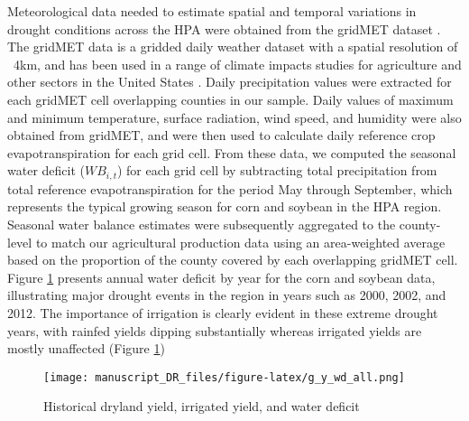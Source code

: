 \documentclass[
]{article}
\begin{document}
Meteorological data needed to estimate spatial and temporal variations in drought conditions across the HPA were obtained from the gridMET dataset \citep{Abatzoglou2013}. The gridMET data is a gridded daily weather dataset with a spatial resolution of ~4km, and has been used in a range of climate impacts studies for agriculture and other sectors in the United States \citep{abatzoglou2016impact, pereira2015crop, crane2018machine, venkatappa2021impacts, zhu2019dissecting}. Daily precipitation values were extracted for each gridMET cell overlapping counties in our sample. Daily values of maximum and minimum temperature, surface radiation, wind speed, and humidity were also obtained from gridMET, and were then used to calculate daily reference crop evapotranspiration for each grid cell. From these data, we computed the seasonal water deficit (\(WB_{i,t}\)) for each grid cell by subtracting total precipitation from total reference evapotranspiration for the period May through September, which represents the typical growing season for corn and soybean in the HPA region. Seasonal water balance estimates were subsequently aggregated to the county-level to match our agricultural production data using an area-weighted average based on the proportion of the county covered by each overlapping gridMET cell. Figure \ref{fig:deficit-yield-hist} presents annual water deficit by year for the corn and soybean data, illustrating major drought events in the region in years such as 2000, 2002, and 2012. The importance of irrigation is clearly evident in these extreme drought years, with rainfed yields dipping substantially whereas irrigated yields are mostly unaffected (Figure \ref{fig:deficit-yield-hist})

\begin{figure}
{\centering \texttt{[image: manuscript\_DR\_files/figure-latex/g\_y\_wd\_all.png]} }
\caption{Historical dryland yield, irrigated yield, and water deficit}\label{fig:deficit-yield-hist}
\end{figure}
\end{document}
